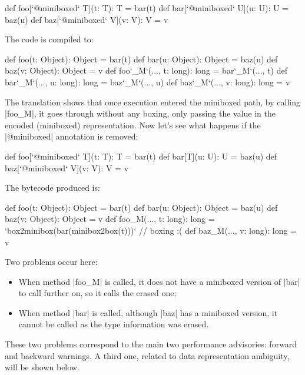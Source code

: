 \begin{lstlisting-nobreak}
 def foo[`@miniboxed` T](t: T): T = bar(t)
 def bar[`@miniboxed` U](u: U): U = baz(u)
 def baz[`@miniboxed` V](v: V): V = v
\end{lstlisting-nobreak}

The code is compiled to:

\begin{lstlisting-nobreak}
 def foo(t: Object): Object = bar(t)
 def bar(u: Object): Object = baz(u)
 def baz(v: Object): Object = v
 def foo`_M`(..., t: long): long = bar`_M`(..., t)
 def bar`_M`(..., u: long): long = baz`_M`(..., u)
 def baz`_M`(..., v: long): long = v
\end{lstlisting-nobreak}

The translation shows that once execution entered the miniboxed path, by calling |foo_M|, it goes through without any boxing, only passing the value in the encoded (miniboxed) representation. Now let's see what happens if the |@miniboxed| annotation is removed:

\begin{lstlisting-nobreak}
 def foo[`@miniboxed` T](t: T): T = bar(t)
 def bar[T](u: U): U = baz(u)
 def baz[`@miniboxed` V](v: V): V = v
\end{lstlisting-nobreak}

The bytecode produced is:

\begin{lstlisting-nobreak}
 def foo(t: Object): Object = bar(t)
 def bar(u: Object): Object = baz(u)
 def baz(v: Object): Object = v
 def foo_M(..., t: long): long = `box2minibox(bar(minibox2box(t)))` // boxing :(
 def baz_M(..., v: long): long = v
\end{lstlisting-nobreak}

Two problems occur here:

\begin{itemize}
 \item When method |foo_M| is called, it does not have a miniboxed version of |bar| to call further on, so it calls the erased one;
 \item When method |bar| is called, although |baz| has a miniboxed version, it cannot be called as the type information was erased.
\end{itemize}

These two problems correspond to the main two performance advisories: forward and backward warnings. A third one, related to data representation ambiguity, will be shown below.

